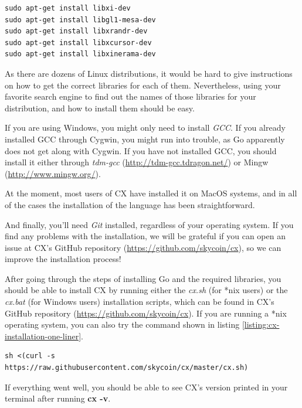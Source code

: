 \documentclass[11pt,fleqn,openany]{book} %
\begin{document}
\begin{appendices}
\begin{lstlisting}[caption={Installing required OpenGL libraries in Ubuntu},captionpos=b,label={listing:installing-opengl}]
sudo apt-get install libxi-dev
sudo apt-get install libgl1-mesa-dev
sudo apt-get install libxrandr-dev
sudo apt-get install libxcursor-dev
sudo apt-get install libxinerama-dev
\end{lstlisting}

As there are dozens of Linux distributions, it would be hard to give instructions on how to get the correct libraries for each of them. Nevertheless, using your favorite search engine to find out the names of those libraries for your distribution, and how to install them should be easy.

If you are using Windows, you might only need to install \emph{GCC}. If you already installed GCC through Cygwin, you might run into trouble, as Go apparently does not get along with Cygwin. If you have not installed GCC, you should install it either through \emph{tdm-gcc} (\url{http://tdm-gcc.tdragon.net/}) or Mingw (\url{http://www.mingw.org/}).

At the moment, most users of CX have installed it on MacOS systems, and in all of the cases the installation of the language has been straightforward.

And finally, you'll need \emph{Git} installed, regardless of your operating system. If you find any problems with the installation, we will be grateful if you can open an issue at CX's GitHub repository (\url{https://github.com/skycoin/cx}), so we can improve the installation process!

After going through the steps of installing Go and the required libraries, you should be able to install CX by running either the \emph{cx.sh} (for *nix users) or the \emph{cx.bat} (for Windows users) installation scripts, which can be found in CX's GitHub repository (\url{https://github.com/skycoin/cx}). If you are running a *nix operating system, you can also try the command shown in listing \ref{listing:cx-installation-one-liner}.

\begin{lstlisting}[caption={One-liner CX installation script for *nix systems},captionpos=b,label={listing:cx-installation-one-liner}]
sh <(curl -s https://raw.githubusercontent.com/skycoin/cx/master/cx.sh)
\end{lstlisting}

If everything went well, you should be able to see CX's version printed in your terminal after running \textbf{cx -v}.

\end{appendices}

\newpage

\printindex

\newpage

\printbibliography[heading=subbibliography,notkeyword=this]
\end{document}
